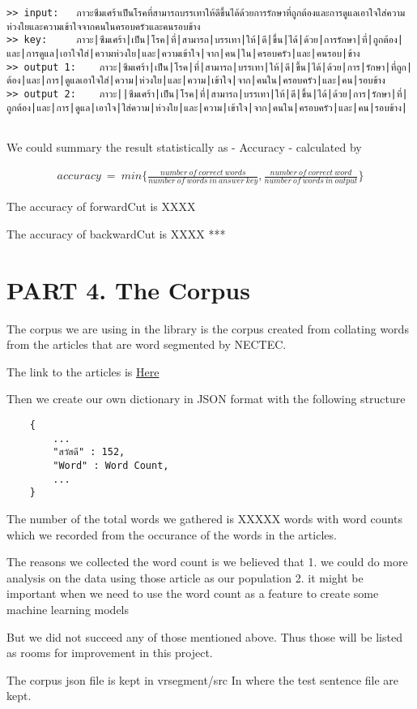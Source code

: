 \documentclass[11pt]{article}
\begin{document}
\begin{Verbatim}[commandchars=\\\{\}]
>> input:	ภาวะซึมเศร้าเป็นโรคที่สามารถบรรเทาให้ดีขึ้นได้ด้วยการรักษาที่ถูกต้องและการดูแลเอาใจใส่ความห่วงใยและความเข้าใจจากคนในครอบครัวและคนรอบข้าง
>> key:		ภาวะ|ซึมเศร้า|เป็น|โรค|ที่|สามารถ|บรรเทา|ให้|ดี|ขึ้น|ได้|ด้วย|การรักษา|ที่|ถูกต้อง|และ|การดูแล|เอาใจใส่|ความห่วงใย|และ|ความเข้าใจ|จาก|คน|ใน|ครอบครัว|และ|คนรอบ|ข้าง
>> output 1:	ภาวะ|ซึมเศร้า|เป็น|โรค|ที่|สามารถ|บรรเทา|ให้|ดี|ขึ้น|ได้|ด้วย|การ|รักษา|ที่ถูก|ต้อง|และ|การ|ดูแลเอาใจใส่|ความ|ห่วงใย|และ|ความ|เข้าใจ|จาก|คนใน|ครอบครัว|และ|คน|รอบข้าง
>> output 2:	ภาวะ||ซึมเศร้า|เป็น|โรค|ที่|สามารถ|บรรเทา|ให้|ดี|ขึ้น|ได้|ด้วย|การ|รักษา|ที่|ถูกต้อง|และ|การ|ดูแล|เอาใจ|ใส่ความ|ห่วงใย|และ|ความ|เข้าใจ|จาก|คนใน|ครอบครัว|และ|คน|รอบข้าง|


    \end{Verbatim}

    We could summary the result statistically as - Accuracy - calculated by

\begin{align}
    accuracy\ =\ min\{ \frac{number\ of\ correct\ words}{number\ of\ words\ in\ answer\ key}, \frac{number\ of\ correct\ word}{number\ of\ words\ in\ output}\}
\end{align}

    The accuracy of forwardCut is XXXX

The accuracy of backwardCut is XXXX ***

    \section{PART 4. The Corpus}\label{part-4.-the-corpus}

The corpus we are using in the library is the corpus created from
collating words from the articles that are word segmented by NECTEC.

The link to the articles is \href{http://www.example.com}{Here}

Then we create our own dictionary in JSON format with the following
structure

\begin{verbatim}
    {
        ...
        "สวัสดี" : 152,
        "Word" : Word Count,
        ...
    }
\end{verbatim}

The number of the total words we gathered is XXXXX words with word
counts which we recorded from the occurance of the words in the
articles.

The reasons we collected the word count is we believed that 1. we could
do more analysis on the data using those article as our population 2. it
might be important when we need to use the word count as a feature to
create some machine learning models

But we did not succeed any of those mentioned above. Thus those will be
listed as rooms for improvement in this project.

The corpus json file is kept in vrsegment/src In where the test sentence
file are kept.


    
    
    
    
\end{document}
